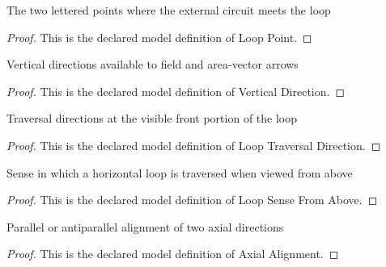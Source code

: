 \begin{definition}
  \label{def:physics:phyx-mini-0935:phyxminiproblems-problemphyxmini0935-looppoint}
  The two lettered points where the external circuit meets the loop
\end{definition}
\begin{proof}
  This is the declared model definition of Loop Point.
\end{proof}
\begin{definition}
  \label{def:physics:phyx-mini-0935:phyxminiproblems-problemphyxmini0935-verticaldirection}
  Vertical directions available to field and area-vector arrows
\end{definition}
\begin{proof}
  This is the declared model definition of Vertical Direction.
\end{proof}
\begin{definition}
  \label{def:physics:phyx-mini-0935:phyxminiproblems-problemphyxmini0935-looptraversaldirection}
  Traversal directions at the visible front portion of the loop
\end{definition}
\begin{proof}
  This is the declared model definition of Loop Traversal Direction.
\end{proof}
\begin{definition}
  \label{def:physics:phyx-mini-0935:phyxminiproblems-problemphyxmini0935-loopsensefromabove}
  Sense in which a horizontal loop is traversed when viewed from above
\end{definition}
\begin{proof}
  This is the declared model definition of Loop Sense From Above.
\end{proof}
\begin{definition}
  \label{def:physics:phyx-mini-0935:phyxminiproblems-problemphyxmini0935-axialalignment}
  Parallel or antiparallel alignment of two axial directions
\end{definition}
\begin{proof}
  This is the declared model definition of Axial Alignment.
\end{proof}

